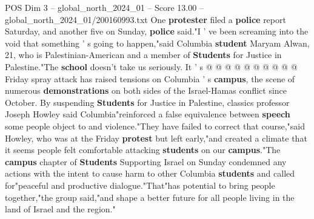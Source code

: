 \begin{textsample}{POS Dim 3 – global\_north\_2024\_01 – Score 13.00 – global\_north\_2024\_01/200160993.txt}
One \textbf{protester} filed a \textbf{police} report Saturday, and another five on Sunday, \textbf{police} said."I ' ve been screaming into the void that something ' s going to happen,"said Columbia \textbf{student} Maryam Alwan, 21, who is Palestinian-American and a member of \textbf{Students} for Justice in Palestine."The \textbf{school} doesn't take us seriously.
It ' s @ @ @ @ @ @ @ @ @ @ Friday spray attack has raised tensions on Columbia ' s \textbf{campus}, the scene of numerous \textbf{demonstrations} on both sides of the Israel-Hamas conflict since October.
By suspending \textbf{Students} for Justice in Palestine, classics professor Joseph Howley said Columbia"reinforced a false equivalence between \textbf{speech} some people object to and violence."They have failed to correct that course,"said Howley, who was at the Friday \textbf{protest} but left early,"and created a climate that it seems people felt comfortable attacking \textbf{students} on our \textbf{campus}."The \textbf{campus} chapter of \textbf{Students} Supporting Israel on Sunday condemned any actions with the intent to cause harm to other Columbia \textbf{students} and called for"peaceful and productive dialogue."That"has potential to bring people together,"the group said,"and shape a better future for all people living in the land of Israel and the region."

\end{textsample}
